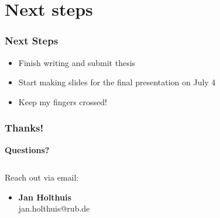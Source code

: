 \documentclass[
    alternativetitlepage=alternativ,
    cornerlogo=hgi_nds_logo2,
    sectionoverview,
]{rubpresentation}
\begin{document}
\section{Next steps}

\begin{frame}
    \frametitle{Next Steps}
    \begin{itemize}
        \item{} Finish writing and submit thesis
        \item{} Start making slides for the final presentation on July 4
        \item{} Keep my fingers crossed! \Winkey[1.5][rubgreen]
    \end{itemize}
\end{frame}


\begin{frame}[plain]
\frametitle{Thanks!}
 \begin{center}
 {\bfseries\fontsize{30pt}{1.2em}\selectfont Questions?}
 \end{center}
  \begin{columns}
    \begin{column}{0.5\textwidth}
      \begin{center}
        Reach out via email:
        \begin{itemize}
        \item \textbf{Jan Holthuis}\\
              jan.holthuis@rub.de
        \end{itemize}
      \end{center}
    \end{column}
    \begin{column}{0.5\textwidth}
      \begin{center}
      \end{center}
    \end{column}
  \end{columns}
\end{frame}
\end{document}

